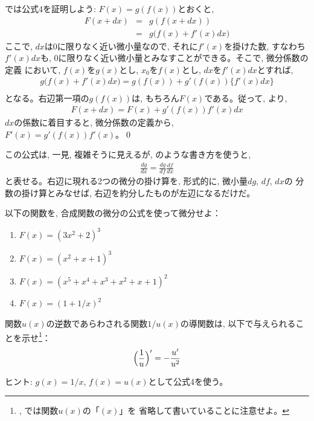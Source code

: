 では公式4を証明しよう: $F(x)=g(f(x))$とおくと, 
\begin{eqnarray}
F(x+dx) & = & g(f(x+dx))\nonumber\\
        & = & g\bigl(f(x)+f'(x)dx\bigr)\label{eq:dif_gosei1}
\end{eqnarray}
ここで, $dx$は0に限りなく近い微小量なので, それに$f'(x)$を掛けた数, すなわち$f'(x)dx$も, 
0に限りなく近い微小量とみなすことができる。そこで, 微分係数の定義
において, $f(x)$を$g(x)$とし, $x_0$を$f(x)$とし, $dx$を$f'(x)dx$とすれば, 
\begin{eqnarray}
g\bigl(f(x)+f'(x)dx\bigr)= g(f(x))+g'(f(x))\{f'(x)dx\}\nonumber\\\label{eq:dif_gosei2}
\end{eqnarray}
となる。右辺第一項の$g(f(x))$は, もちろん$F(x)$である。従って, より, 
\begin{eqnarray}
F(x+dx)=F(x)+g'(f(x))f'(x)dx\label{eq:dif_gosei3}
\end{eqnarray}
$dx$の係数に着目すると, 微分係数の定義から, \\
$F'(x)=g'(f(x))f'(x)$。\qed
\vv

この公式は, 一見, 複雑そうに見えるが, のような書き方を使うと,
\begin{eqnarray}
\frac{dg}{dx}=\frac{dg}{df}\frac{df}{dx}\label{eq:diff_form45}
\end{eqnarray}
と表せる。右辺に現れる2つの微分の掛け算を, 形式的に, 微小量$dg$, $df$, $dx$の
分数の掛け算とみなせば, 右辺を約分したものが左辺になるだけだ。\mv

\begin{q}\label{q:diff_func2} 以下の関数を, 合成関数の微分の公式を使って微分せよ：
\begin{enumerate}
\item $F(x)=(3x^2+2)^3$
\item $F(x)=(x^2+x+1)^3$
\item $F(x)=(x^5+x^4+x^3+x^2+x+1)^2$
\item $F(x)=(1+1/x)^2$
\end{enumerate}\end{q}
\mv


\begin{q}\label{q:diff_func3} 関数$u(x)$の逆数であらわされる関数$1/u(x)$の導関数は, 
以下で与えられることを示せ\footnote{, では関数$u(x)$の「$(x)$」を
省略して書いていることに注意せよ。}：
\begin{eqnarray}
\Bigl(\frac{1}{u}\Bigr)'=-\frac{u'}{u^2}\label{eq:difdiv0}
\end{eqnarray}\end{q}
ヒント: $g(x)=1/x$, $f(x)=u(x)$として公式4を使う。
\mv

